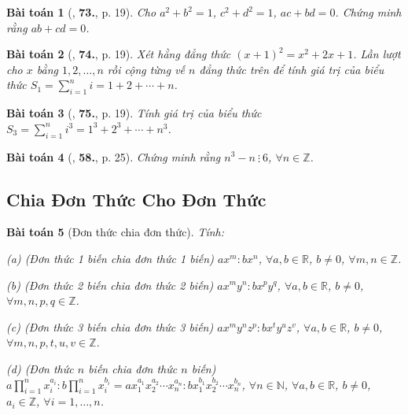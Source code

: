 \documentclass{article}
\numberwithin{equation}{section}
\newtheorem{baitoan}{Bài toán}[section]
\begin{document}
\begin{baitoan}[\cite{Binh_Toan_8_tap_1}, \textbf{73.}, p. 19]
	Cho $a^2 + b^2 = 1$, $c^2 + d^2 = 1$, $ac + bd = 0$. Chứng minh rằng $ab + cd = 0$.
\end{baitoan}

\begin{baitoan}[\cite{Binh_Toan_8_tap_1}, \textbf{74.}, p. 19]
	Xét hằng đẳng thức $(x + 1)^2 = x^2 + 2x + 1$. Lần lượt cho $x$ bằng $1,2,\ldots,n$ rồi cộng từng vế $n$ đẳng thức trên để tính giá trị của biểu thức $S_1 = \sum_{i=1}^n i = 1 + 2 + \cdots + n$.
\end{baitoan}

\begin{baitoan}[\cite{Binh_Toan_8_tap_1}, \textbf{75.}, p. 19]
	Tính giá trị của biểu thức $S_3 = \sum_{i=1}^n i^3 = 1^3 + 2^3 + \cdots + n^3$.
\end{baitoan}

\begin{baitoan}[\cite{SGK_Toan_8_tap_1}, \textbf{58.}, p. 25]
	Chứng minh rằng $n^3 - n\ \vdots\ 6$, $\forall n\in\mathbb{Z}$.
\end{baitoan}


\subsection{Chia Đơn Thức Cho Đơn Thức}

\begin{baitoan}[Đơn thức chia đơn thức]
	Tính:
	\begin{enumerate*}
		\item[(a)] \emph{(Đơn thức 1 biến chia đơn thức 1 biến)} $ax^m:bx^n$, $\forall a,b\in\mathbb{R}$, $b\ne 0$, $\forall m,n\in\mathbb{Z}$.
		\item[(b)] \emph{(Đơn thức 2 biến chia đơn thức 2 biến)} $ax^my^n:bx^py^q$, $\forall a,b\in\mathbb{R}$, $b\ne 0$, $\forall m,n,p,q\in\mathbb{Z}$.
		\item[(c)] \emph{(Đơn thức 3 biến chia đơn thức 3 biến)} $ax^my^nz^p:bx^ty^uz^v$, $\forall a,b\in\mathbb{R}$, $b\ne 0$, $\forall m,n,p,t,u,v\in\mathbb{Z}$.
		\item[(d)] \emph{(Đơn thức $n$ biến chia đơn thức $n$ biến)} $a\prod_{i=1}^n x_i^{a_i}:b\prod_{i=1}^n x_i^{b_i} = ax_1^{a_1}x_2^{a_2}\cdots x_n^{a_n}:bx_1^{b_1}x_2^{b_2}\cdots x_n^{b_n}$, $\forall n\in\mathbb{N}$, $\forall a,b\in\mathbb{R}$, $b\ne 0$, $a_i\in\mathbb{Z}$, $\forall i = 1,\ldots,n$.
	\end{enumerate*}
\end{baitoan}
\end{document}
